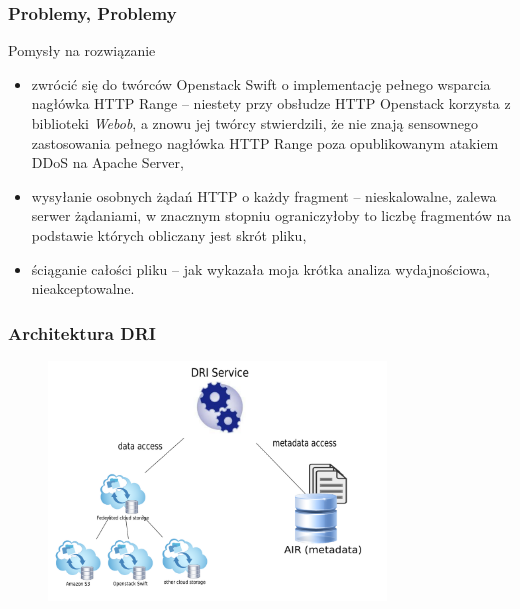 \documentclass{beamer}
\begin{document}
\begin{frame}
\frametitle{Problemy, Problemy}
\begin{block}{Pomysły na rozwiązanie}
\begin{itemize}
	\item zwrócić się do twórców Openstack Swift o implementację pełnego wsparcia nagłówka HTTP Range -- niestety przy obsłudze HTTP Openstack korzysta z biblioteki \textit{Webob}, a znowu jej twórcy stwierdzili, że nie znają sensownego zastosowania pełnego nagłówka HTTP Range poza opublikowanym atakiem DDoS na Apache Server,
	\item wysyłanie osobnych żądań HTTP o każdy fragment -- nieskalowalne, zalewa serwer żądaniami, w znacznym stopniu ograniczyłoby to liczbę fragmentów na podstawie których obliczany jest skrót pliku,
	\item ściąganie całości pliku -- jak wykazała moja krótka analiza wydajnościowa, nieakceptowalne.
\end{itemize}
\end{block}
\end{frame}

\begin{frame}
	\titlepage
\end{frame}

\begin{frame}
\frametitle{Architektura DRI}
\begin{figure}
\includegraphics[width=0.8\textwidth]{schemat.pdf}
\end{figure}
\end{frame}
\end{document}
